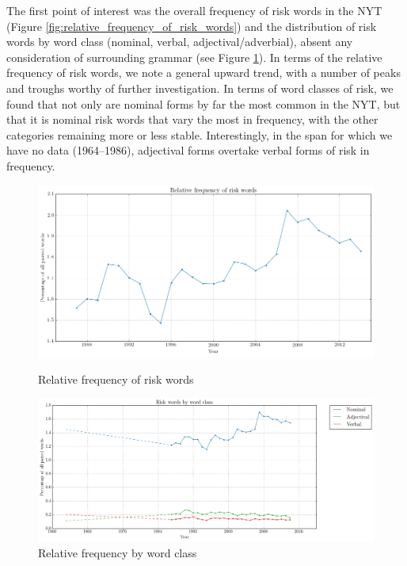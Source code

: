    The first point of interest was the overall frequency of risk words in the NYT (Figure \ref{fig:relative_frequency_of_risk_words}) and the distribution of risk words by word class (nominal, verbal, adjectival\slash adverbial), absent any consideration of surrounding grammar (see Figure \ref{fig:wordclasses}). In terms of the relative frequency of risk words, we note a general upward trend, with a number of peaks and troughs worthy of further investigation. In terms of word classes of risk, we found that not only are nominal forms by far the most common in the NYT, but that it is nominal risk words that vary the most in frequency, with the other categories remaining more or less stable. Interestingly, in the span for which we have no data (1964--1986), adjectival forms overtake verbal forms of risk in frequency.


    \noindent
    \begin{figure}[htb!]
    \centering
    \begin{minipage}{.45\textwidth}
    \centering
    \includegraphics[width=.95\textwidth]{../images/relative_frequency_of_risk_words.png}
    \caption{Relative frequency of risk words}
    \label{fig:relative_frequency_of_risk_words}
    \end{minipage}%
    \begin{minipage}{.55\textwidth}
    \centering
    \includegraphics[width=.95\textwidth]{../images/risk_words_by_word_class.png}
    \caption{Relative frequency by word class}
    \label{fig:wordclasses}
    \end{minipage}
    \end{figure}

